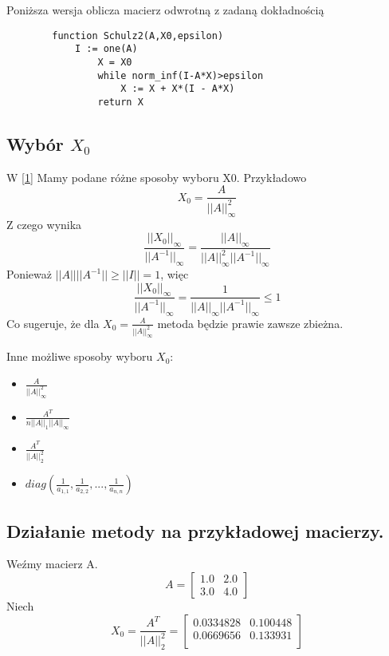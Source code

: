 \documentclass[11pt,a4paper]{article}
\begin{document}
    Poniższa wersja oblicza macierz odwrotną z zadaną dokładnością
    \begin{verbatim}
        function Schulz2(A,X0,epsilon)
            I := one(A)
                X = X0
                while norm_inf(I-A*X)>epsilon
                    X := X + X*(I - A*X)
                return X
    \end{verbatim}

    \subsection{Wybór \textbf{$X_0$}}
    W \href{https://www.hindawi.com/journals/tswj/2013/708647/}{[1]} Mamy podane różne sposoby wyboru X0. Przykładowo
    $$X_0=\frac{A}{||A||_\infty^2}$$
    Z czego wynika
    $$\frac{||X_0||_\infty}{||A^{-1}||_\infty} = \frac{||A||_\infty}{||A||_\infty^2||A^{-1}||_\infty}$$
    Ponieważ $||A||||A^{-1}|| \geq ||I|| =1$, więc
    $$ \frac{||X_0||_\infty}{||A^{-1}||_\infty} = \frac{1}{||A||_\infty||A^{-1}||_\infty} \leq 1$$
    Co sugeruje, że dla $X_0=\frac{A}{||A||_\infty^2}$ metoda będzie prawie zawsze zbieżna.

    Inne możliwe sposoby wyboru $X_0$:
    \begin{itemize}
        \item $\frac{A}{||A||_\infty^2}$
        \item $\frac{A^T}{n||A||_1||A||_\infty}$
        \item $\frac{A^T}{||A||_2^2}$
        \item $diag(\frac{1}{a_{1,1}},\frac{1}{a_{2,2}},...,\frac{1}{a_{n,n}})$
    \end{itemize}

    \subsection{Działanie metody na przykładowej macierzy.}
    Weźmy macierz A.\\
    $$A = \left[
            \begin{array}{cc}
                1.0 & 2.0\\
                3.0 & 4.0
            \end{array}
        \right]
    $$
    Niech
    $$ X_0 = \frac{A^T}{||A||_2^2} = 
            \left[
                \begin{array}{cc}
                    0.0334828 & 0.100448 \\
                    0.0669656 & 0.133931 \\
                \end{array}
            \right]
    $$
\end{document}
